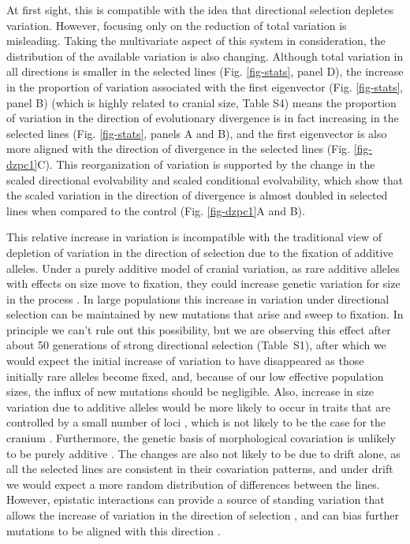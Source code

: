 \begin{refsection}
At first sight, this is compatible with the idea that directional
selection depletes variation. However, focusing only on the reduction of
total variation is misleading. Taking the multivariate aspect of this
system in consideration, the distribution of the available variation is
also changing. Although total variation in all directions is smaller in
the selected lines (Fig. \ref{fig-stats}, panel D), the increase in
the proportion of variation associated with the first eigenvector (Fig.
\ref{fig-stats}, panel B) (which is highly related to cranial size,
Table S4) means the proportion of variation in the direction of
evolutionary divergence is in fact increasing in the selected lines
(Fig. \ref{fig-stats}, panels A and B), and the first eigenvector is
also more aligned with the direction of divergence in the selected lines
(Fig. \ref{fig-dzpc1}C). This reorganization of variation is supported
by the change in the scaled directional evolvability and scaled
conditional evolvability, which show that the scaled variation in the
direction of divergence is almost doubled in selected lines when
compared to the control (Fig. \ref{fig-dzpc1}A and B).

This relative increase in variation is incompatible with the traditional
view of depletion of variation in the direction of selection due to the
fixation of additive alleles. Under a purely additive model of cranial
variation, as rare additive alleles with effects on size move to
fixation, they could increase genetic variation for size in the process
\parencite{Burger1995-qd}. In large populations this increase in variation under
directional selection can be maintained by new mutations that arise and
sweep to fixation. In principle we can't rule out this possibility, but
we are observing this effect after about 50 generations of strong
directional selection (Table~S1), after which we would expect the
initial increase of variation to have disappeared as those initially
rare alleles become fixed, and, because of our low effective population
sizes, the influx of new mutations should be negligible. Also, increase
in size variation due to additive alleles would be more likely to occur
in traits that are controlled by a small number of loci \parencite{Burger1995-qd, Jain2015-fj}, which is not likely to be the case for the cranium
\parencite{Leamy1999-dm, Wolf2005-nr, Porto2016-qc}. Furthermore, the genetic basis of
morphological covariation is unlikely to be purely additive
\parencite{Phillips2001-xb, Whitlock2002-yb}. The changes are also not likely to be
due to drift alone, as all the selected lines are consistent in their
covariation patterns, and under drift we would expect a more random
distribution of differences between the lines. However, epistatic
interactions can provide a source of standing variation that allows the
increase of variation in the direction of selection
\parencite{Cheverud1995-nm, Wagner2007-cx, Pavlicev2011-xm, Melo2015-bk}, and can bias
further mutations to be aligned with this direction
\parencite{Jones2007-xe, Jones2014-wj}.


\end{refsection}
